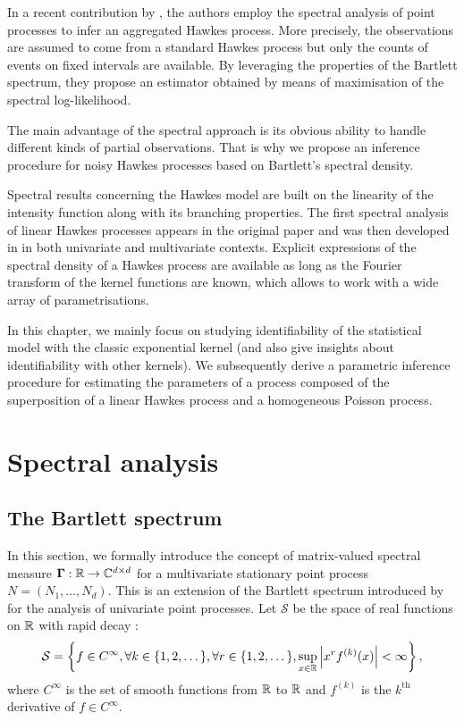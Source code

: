         In a recent contribution by \textcite{Cheysson2022}, the authors employ the spectral analysis of point processes to infer an aggregated Hawkes process. More precisely, the observations are assumed to come from a standard Hawkes process but only the counts of events on fixed intervals are available.
        By leveraging the properties of the Bartlett spectrum, they propose an estimator obtained by means of maximisation of the spectral log-likelihood.

        The main advantage of the spectral approach is its obvious ability to handle different kinds of partial observations.
        That is why we propose an inference procedure for noisy Hawkes processes based on Bartlett's spectral density.
        
        Spectral results concerning the Hawkes model are built on the linearity of the intensity function along with its branching properties.
        The first spectral analysis of linear Hawkes processes appears in the original paper \textcite{Hawkes1971} and was then developed in \textcite{DaleyV1} in both univariate and multivariate contexts.
        Explicit expressions of the spectral density of a Hawkes process are available as long as the Fourier transform of the kernel functions are known, which allows to work with a wide array of parametrisations.

        In this chapter, we mainly focus on studying identifiability of the statistical model with the classic exponential kernel
        (and also give insights about identifiability with other kernels).
        We subsequently derive a parametric inference procedure for estimating the parameters of a process composed of the superposition of a linear Hawkes process and a homogeneous Poisson process.

        
    \section{Spectral analysis}\label{sec:chap4_spectral_estimation}
      \subsection{The Bartlett spectrum}\label{sec:chap4_spectral_analysis}
        In this section, we formally introduce the concept of matrix-valued spectral measure
        $\mathbf \Gamma : {\mathbb R} \to \mathbb C^{d \times d}$
        for a multivariate stationary point process $N = (N_1, \ldots, N_d)$.
        This is an extension of the Bartlett spectrum introduced by \textcite{Bartlett1963} for the analysis of univariate point processes.
        Let $\mathcal S$ be
        the space of real functions on ${\mathbb R}$ with rapid decay \parencite[Chapter 8.6.1]{DaleyV1}:
        \[
          \mathcal S = \left\{ f \in C^\infty, \forall k \in \{1, 2, \dots\}, \forall r \in \{1, 2, \dots\},
          \sup_{x \in {\mathbb R}} \left| x^r
          f^{(k)}(x)
          \right| < \infty \right\},
        \]
        where $C^\infty$ is the set of smooth functions from ${\mathbb R}$ to ${\mathbb R}$
        and $f^{(k)}$ is the \(k^\text{th}\) derivative of \(f \in C^\infty\).

